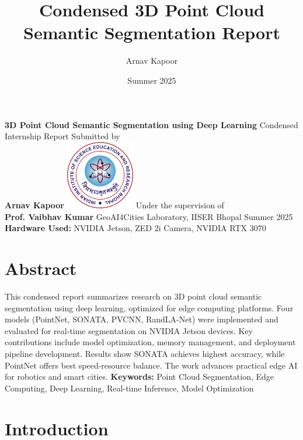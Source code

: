 \documentclass[12pt,a4paper]{report}
\title{Condensed 3D Point Cloud Semantic Segmentation Report}
\author{Arnav Kapoor}
\date{Summer 2025}
\begin{document}
\begin{titlepage}
    \centering
    \vspace*{1cm}
    {\LARGE\textbf{3D Point Cloud Semantic Segmentation using Deep Learning}}
    \vspace{0.5cm}
    {\Large Condensed Internship Report}
    \vspace{2cm}
    {\large Submitted by}\\
    \vspace{0.5cm}
    {\Large\textbf{Arnav Kapoor}}
    \vspace{2cm}
    \includegraphics[width=3cm]{logo.png}
    \vspace{1cm}
    {\large Under the supervision of}\\
    \vspace{0.5cm}
    {\Large\textbf{Prof. Vaibhav Kumar}}
    \vspace{2cm}
    {\large GeoAI4Cities Laboratory, IISER Bhopal}
    \vspace{2cm}
    {\large Summer 2025}
    \vfill
    {\large \textbf{Hardware Used:} NVIDIA Jetson, ZED 2i Camera, NVIDIA RTX 3070}
\end{titlepage}
\newpage
\chapter*{Abstract}
This condensed report summarizes research on 3D point cloud semantic segmentation using deep learning, optimized for edge computing platforms. Four models (PointNet, SONATA, PVCNN, RandLA-Net) were implemented and evaluated for real-time segmentation on NVIDIA Jetson devices. Key contributions include model optimization, memory management, and deployment pipeline development. Results show SONATA achieves highest accuracy, while PointNet offers best speed-resource balance. The work advances practical edge AI for robotics and smart cities.
\textbf{Keywords:} Point Cloud Segmentation, Edge Computing, Deep Learning, Real-time Inference, Model Optimization
\newpage
\tableofcontents
\newpage
\chapter{Introduction}
\end{document}
